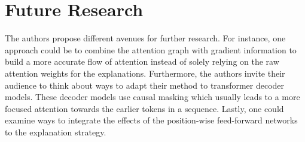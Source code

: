 \documentclass[12pt,a4paper]{article}
\begin{document}
\section{Future Research}

The authors propose different avenues for further research. For instance, one approach could be to combine the attention graph with gradient information to build a more accurate flow of attention instead of solely relying on the raw attention weights for the explanations. Furthermore, the authors invite their audience to think about ways to adapt their method to transformer decoder models. These decoder models use causal masking which usually leads to a more focused attention towards the earlier tokens in a sequence. Lastly, one could examine ways to integrate the effects of the position-wise feed-forward networks to the explanation strategy.
\end{document}
